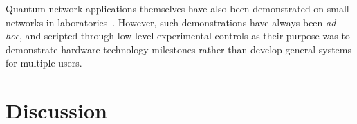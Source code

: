 Quantum network applications themselves have also been demonstrated on small networks in
laboratories~\cite{barz_2012_demonstration}. However, such demonstrations have always been \emph{ad
hoc}, and scripted through low-level experimental controls as their purpose was to demonstrate
hardware technology milestones rather than develop general systems for multiple users.

\section{Discussion}

\noindent
{}

\printbibliography[heading=subbibintoc,title={References},notcategory=noprint]
